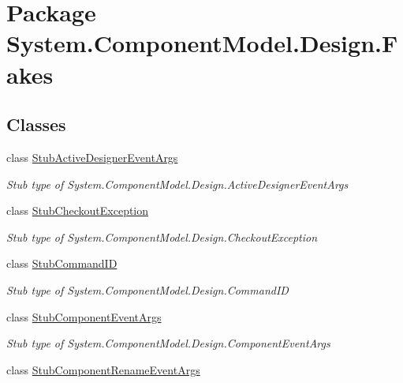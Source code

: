 \hypertarget{namespace_system_1_1_component_model_1_1_design_1_1_fakes}{\section{Package System.\-Component\-Model.\-Design.\-Fakes}
\label{namespace_system_1_1_component_model_1_1_design_1_1_fakes}
}
\subsection*{Classes}
\begin{DoxyCompactItemize}
\item 
class \hyperlink{class_system_1_1_component_model_1_1_design_1_1_fakes_1_1_stub_active_designer_event_args}{Stub\-Active\-Designer\-Event\-Args}
\begin{DoxyCompactList}\small\item\em Stub type of System.\-Component\-Model.\-Design.\-Active\-Designer\-Event\-Args\end{DoxyCompactList}\item 
class \hyperlink{class_system_1_1_component_model_1_1_design_1_1_fakes_1_1_stub_checkout_exception}{Stub\-Checkout\-Exception}
\begin{DoxyCompactList}\small\item\em Stub type of System.\-Component\-Model.\-Design.\-Checkout\-Exception\end{DoxyCompactList}\item 
class \hyperlink{class_system_1_1_component_model_1_1_design_1_1_fakes_1_1_stub_command_i_d}{Stub\-Command\-I\-D}
\begin{DoxyCompactList}\small\item\em Stub type of System.\-Component\-Model.\-Design.\-Command\-I\-D\end{DoxyCompactList}\item 
class \hyperlink{class_system_1_1_component_model_1_1_design_1_1_fakes_1_1_stub_component_event_args}{Stub\-Component\-Event\-Args}
\begin{DoxyCompactList}\small\item\em Stub type of System.\-Component\-Model.\-Design.\-Component\-Event\-Args\end{DoxyCompactList}\item 
class \hyperlink{class_system_1_1_component_model_1_1_design_1_1_fakes_1_1_stub_component_rename_event_args}{Stub\-Component\-Rename\-Event\-Args}

\end{DoxyCompactItemize}
